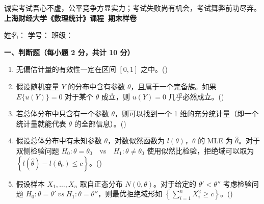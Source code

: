 \documentclass[12pt,a4paper]{ctexart}
\newcommand{\question}[1]{\bigskip\noindent\textbf{#1}\par\nobreak\medskip}
\begin{document}
\begin{center}
  {\small 诚实考试吾心不虚，公平竞争方显实力；考试失败尚有机会，考试舞弊前功尽弃。}\\[2mm]
  {\LARGE\bfseries 上海财经大学《数理统计》课程\ 期末样卷}
\end{center}

\vspace{2mm}
\noindent
姓名：\underline{\hspace{2.6cm}}\hfill
学号：\underline{\hspace{2.6cm}}\hfill
班级：\underline{\hspace{2.6cm}}

\vspace{3mm}

\question{一、判断题（每小题 2 分，共计 10 分）}
\begin{enumerate}[label=\arabic*.,leftmargin=2.2em]
  \item 无偏估计量的有效性一定在区间 $[0,1]$ 之中。\hfill(\underline{\hspace{1.2cm}})
  \item 假设随机变量 $Y$ 的分布中含有参数 $\theta$，且属于一个完备族。如果 $E\{u(Y)\}=0$ 对于某个 $\theta$ 成立，则 $u(Y)=0$ 几乎必然成立。\hfill(\underline{\hspace{1.2cm}})
  \item 若总体分布中只含有一个参数 $\theta$，则可以找到一个 1 维的充分统计量（即一个统计量就能代表 $\theta$ 的全部信息）。\hfill(\underline{\hspace{1.2cm}})
  \item 假设总体分布中有未知参数 $\theta$，对数似然函数为 $l(\theta)$，$\theta$ 的 MLE 为 $\widehat{\theta}$。对于双侧检验问题 $H_{0}:\theta=\theta_{0}$\ \ vs\ \ $H_{1}:\theta\neq\theta_{0}$ 使用似然比检验，拒绝域可以取为 $\left\{l\left(\widehat{\theta}\right)-l\left(\theta_{0}\right)\le c\right\}$。\hfill(\underline{\hspace{1.2cm}})
  \item 假设样本 $X_{1},\ldots,X_{n}$ 取自正态分布 $N(0,\theta)$。对于给定的 $\theta'<\theta''$ 考虑检验问题 $H_{0}:\theta=\theta'\ vs\ H_{1}:\theta=\theta''$，则最优拒绝域形如 $\left\{\sum_{i=1}^{n}X_{i}^{2}\ge c\right\}$。\hfill(\underline{\hspace{1.2cm}})
\end{enumerate}
\end{document}
